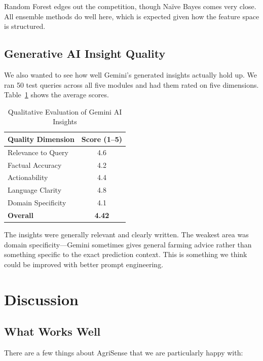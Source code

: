 \documentclass[conference]{IEEEtran}
\begin{document}
Random Forest edges out the competition, though Na\"ive Bayes comes very close. All ensemble methods do well here, which is expected given how the feature space is structured.

\subsection{Generative AI Insight Quality}
We also wanted to see how well Gemini's generated insights actually hold up. We ran 50 test queries across all five modules and had them rated on five dimensions. Table~\ref{tab:gemini_eval} shows the average scores.

\begin{table}[htbp]
\caption{Qualitative Evaluation of Gemini AI Insights}
\label{tab:gemini_eval}
\centering
\begin{tabular}{@{}lc@{}}
\toprule
\textbf{Quality Dimension} & \textbf{Score (1--5)} \\
\midrule
Relevance to Query & 4.6 \\
Factual Accuracy & 4.2 \\
Actionability & 4.4 \\
Language Clarity & 4.8 \\
Domain Specificity & 4.1 \\
\textbf{Overall} & \textbf{4.42} \\
\bottomrule
\end{tabular}
\end{table}

The insights were generally relevant and clearly written. The weakest area was domain specificity---Gemini sometimes gives general farming advice rather than something specific to the exact prediction context. This is something we think could be improved with better prompt engineering.

\section{Discussion}
\label{sec:discussion}

\subsection{What Works Well}
There are a few things about AgriSense that we are particularly happy with:
\end{document}
